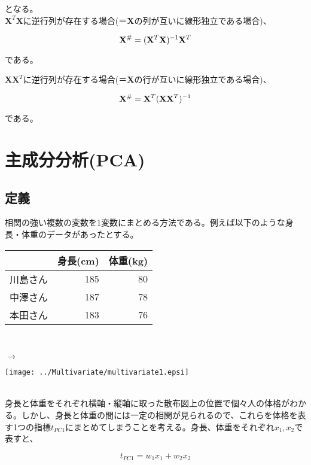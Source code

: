 となる。\\

\({\mathbf X}^T{\mathbf X}\)に逆行列が存在する場合(＝{\bf X}の列が互いに線形独立である場合)、

\[ {\mathbf X}^{\#} = ({\bf X}^T{\bf X})^{-1}{\bf X}^T \]

である。

\({\mathbf X}{\mathbf X}^T\)に逆行列が存在する場合(＝{\bf X}の行が互いに線形独立である場合)、

\[ {\mathbf X}^{\#} = {\bf X}^T ({\bf X}{\bf X}^T)^{-1}\]

である。




\section{主成分分析(PCA)}
\subsection{定義}
相関の強い複数の変数を1変数にまとめる方法である。例えば以下のような身長・体重のデータがあったとする。\\
\begin{minipage}{185pt}

\begin{tabular}{l|rr}
\hline
 & 身長(cm) & 体重(kg) \\
\hline
川島さん & 185 & 80 \\
中澤さん & 187 & 78 \\
本田さん & 183 & 76 \\
\hline
\end{tabular}\\
\end{minipage}
\(\longrightarrow\)
\begin{minipage}{200pt}
\begin{center}
\texttt{[image: ../Multivariate/multivariate1.epsi]}
\end{center}
\end{minipage}\\

身長と体重をそれぞれ横軸・縦軸に取った散布図上の位置で個々人の体格がわかる。しかし、身長と体重の間には一定の相関が見られるので、これらを体格を表す1つの指標\(t_{PC1}\)にまとめてしまうことを考える。身長、体重をそれぞれ\(x_1, x_2\)で表すと、

\[t_{PC1} = w_1 x_1 + w_2 x_2\]

